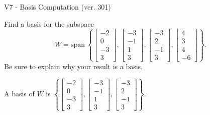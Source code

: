 \begin{exercise}
  \begin{exerciseTitle}V7 - Basis Computation (ver. 301)\end{exerciseTitle}
  \begin{exerciseStatement}
    Find a basis for the subspace 
\[W=\mathrm{span}\ \left\{\left[\begin{array}{r}
-2 \\
0 \\
-3 \\
3
\end{array}\right] , \left[\begin{array}{r}
-3 \\
-1 \\
1 \\
3
\end{array}\right] , \left[\begin{array}{r}
-3 \\
2 \\
-1 \\
3
\end{array}\right] , \left[\begin{array}{r}
4 \\
3 \\
4 \\
-6
\end{array}\right]\right\}.\]
 Be sure to explain why your result is a basis.


  \end{exerciseStatement}
  \begin{exerciseAnswer}
   A basis of \(W\) is  \(\left\{\left[\begin{array}{r}
-2 \\
0 \\
-3 \\
3
\end{array}\right] , \left[\begin{array}{r}
-3 \\
-1 \\
1 \\
3
\end{array}\right] , \left[\begin{array}{r}
-3 \\
2 \\
-1 \\
3
\end{array}\right]\right\}\).
  


  \end{exerciseAnswer}
\end{exercise}